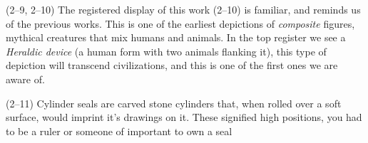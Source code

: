 \documentclass{article}
\begin{document}
\begin{spacing}{1.2}
    (2--9, 2--10) The registered display of this work (2--10) is familiar, and
    reminds us of the previous works. This is one of the earliest depictions
    of \emph{composite} figures, mythical creatures that mix humans and animals.
    In the top register we see a \emph{Heraldic device} (a human form with two
    animals flanking it), this type of depiction will transcend civilizations,
    and this is one of the first ones we are aware of.
    
    (2--11) Cylinder seals are carved stone cylinders that, when rolled over a
    soft surface, would imprint it's drawings on it. These signified high
    positions, you had to be a ruler or someone of important to own a seal

    \end{spacing}
    
\end{document}
